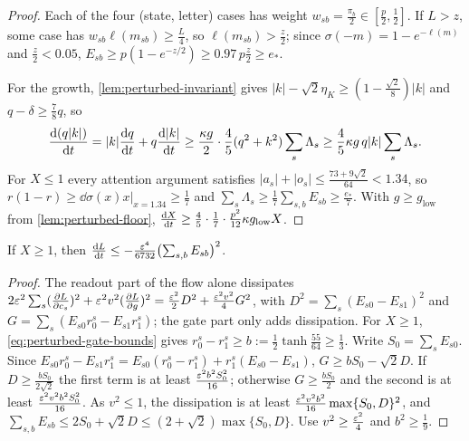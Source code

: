 \begin{proof}
Each of the four (state, letter) cases has weight $w_{sb}=\frac{\pi_b}2\in[\frac p2,\frac12]$. If $L>z$, some case has $w_{sb}\ell(m_{sb})\ge\frac L4$,
so $\ell(m_{sb})>\frac z2$; since $\sigma(-m)=1-e^{-\ell(m)}$ and $\frac z2<0.05$, $E_{sb}\ge p(1-e^{-z/2})\ge0.97\,p\frac z2\ge e_\ast$.

For the growth, \cref{lem:perturbed-invariant} gives $|k|-\sqrt2\eta_K\ge(1-\frac{\sqrt2}8)|k|$ and $q-\delta\ge\frac78q$, so
\[
 \ddt{(q|k|)}=|k|\ddt{q}+q\ddt{|k|}\ge\frac{\kappa g}2\cdot\frac45(q^2+k^2)\sum_s\Lambda_s\ge\frac45\kappa g\,q|k|\sum_s\Lambda_s .
\]
For $X\le1$ every attention argument satisfies $|a_s|+|o_s|\le\frac{73+9\sqrt2}{64}<1.34$, so $r(1-r)\ge\dd{\sigma(x)}{x}\big|_{x=1.34}\ge\frac17$ and
$\sum_s\Lambda_s\ge\frac17\sum_{s,b}E_{sb}\ge\frac{e_\ast}7$. With $g\ge g_{\mathrm{low}}$ from \cref{lem:perturbed-floor},
$\ddt{X}\ge\frac45\cdot\frac17\cdot\frac{p^2}{12}\kappa g_{\mathrm{low}}X$.
\end{proof}

\begin{lemma}
\label{lem:perturbed-descent}
If $X\ge1$, then $\ddt{L}\le-\frac{\initscale^4}{6732}\bigl(\sum_{s,b}E_{sb}\bigr)^2$.
\end{lemma}

\begin{proof}
The readout part of the flow alone dissipates $2\initscale^2\sum_s(\pd{L}{c_s})^2+\initscale^2v^2(\pd{L}{g})^2
=\frac{\initscale^2}2D^2+\frac{\initscale^2v^2}4G^2$, with $D^2=\sum_s(E_{s0}-E_{s1})^2$ and $G=\sum_s(E_{s0}r^s_0-E_{s1}r^s_1)$; the gate part only adds
dissipation. For $X\ge1$, \cref{eq:perturbed-gate-bounds} gives $r^s_0-r^s_1\ge b:=\frac12\tanh\frac{55}{64}\ge\frac13$. Write $S_0=\sum_sE_{s0}$.
Since $E_{s0}r^s_0-E_{s1}r^s_1=E_{s0}(r^s_0-r^s_1)+r^s_1(E_{s0}-E_{s1})$, $G\ge bS_0-\sqrt2D$. If $D\ge\frac{bS_0}{2\sqrt2}$ the first term is at least
$\frac{\varepsilon^2b^2S_0^2}{16}$; otherwise $G\ge\frac{bS_0}2$ and the second is at least $\frac{\varepsilon^2v^2b^2S_0^2}{16}$. As $v^2\le1$, the dissipation is at
least $\frac{\varepsilon^2v^2b^2}{16}\max\{S_0,D\}^2$, and $\sum_{s,b}E_{sb}\le2S_0+\sqrt2D\le(2+\sqrt2)\max\{S_0,D\}$. Use $v^2\ge\frac{\varepsilon^2}4$ and
$b^2\ge\frac19$.
\end{proof}

